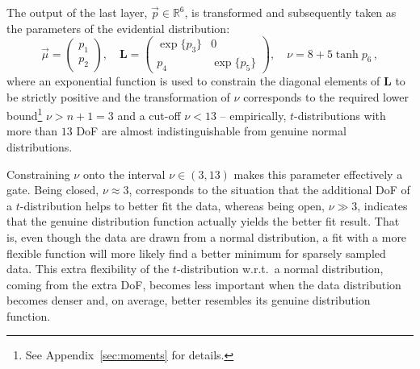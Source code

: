 \documentclass{article}
\begin{document}
The output of the last layer, $\vec{p} \in \mathbb{R}^6$, is transformed and subsequently taken as the parameters of the evidential distribution:
\begin{equation}
    \vec{\mu} = \begin{pmatrix} p_1 \\ p_2 \end{pmatrix},
    \quad
    \bm{L} = \begin{pmatrix} \exp \{ p_3 \} & 0 \\ p_4 & \exp \{ p_5 \} \end{pmatrix},
    \quad
    \nu = 8 + 5 \tanh p_6 \,,
\end{equation}
where an exponential function is used to constrain the diagonal elements of $\bm{L}$ to be strictly positive and the transformation of $\nu$ corresponds to the required lower bound\footnote{See Appendix~\ref{sec:moments} for details.} $\nu > n + 1 = 3$ and a cut-off $\nu < 13$ -- empirically, $t$-distributions with more than $13$ DoF are almost indistinguishable from genuine normal distributions.

Constraining $\nu$ onto the interval $\nu \in (3, 13)$ makes this parameter effectively a gate.
Being closed, $\nu \approx 3$, corresponds to the situation that the additional DoF of a $t$-distribution helps to better fit the data, whereas being open, $\nu \gg 3$, indicates that the genuine distribution function actually yields the better fit result.
That is, even though the data are drawn from a normal distribution, a fit with a more flexible function will more likely find a better minimum for sparsely sampled data.
This extra flexibility of the $t$-distribution w.r.t.\ a normal distribution, coming from the extra DoF, becomes less important when the data distribution becomes denser and, on average, better resembles its genuine distribution function.
\end{document}
